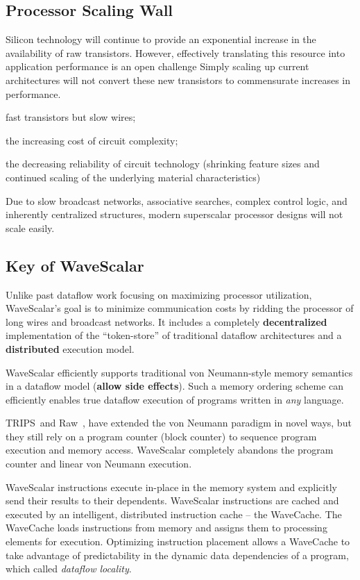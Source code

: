 \documentclass[UTF8,12pt,a4paper]{article}
\begin{document}
\subsection{Processor Scaling Wall}
Silicon technology will continue to provide an exponential increase in the availability of raw transistors.
However, effectively translating this resource into application performance is an open challenge
Simply scaling up current architectures will not convert these new transistors to commensurate increases in performance.

\begin{compactitem}
  \item fast transistors but slow wires;
  \item the increasing cost of circuit complexity;
  \item  the decreasing reliability of circuit technology (shrinking feature sizes
  and continued scaling of the underlying material characteristics)
\end{compactitem}
Due to slow broadcast networks, associative searches,
complex control logic, and inherently centralized structures,
modern superscalar processor designs will not scale easily.

\subsection{Key of WaveScalar}

Unlike past dataflow work focusing on maximizing processor utilization,
WaveScalar’s goal is to minimize communication costs by ridding the processor of long wires and broadcast networks.
It includes a completely \textbf{decentralized} implementation of the ``token-store'' of traditional dataflow architectures
and a \textbf{distributed} execution model.

WaveScalar efficiently supports traditional von Neumann-style memory semantics
in a dataflow model (\textbf{allow side effects}).
Such a memory ordering scheme can efficiently enables
true dataflow execution of programs written in \textit{any} language.

TRIPS~\cite{DBLP:conf/isca/SankaralingamNLKHBKM03}and Raw~\cite{DBLP:conf/asplos/LeeBFSBSA98},
have extended the von Neumann paradigm in novel ways,
but they still rely on a program counter (block counter)
to sequence program execution and memory access.
WaveScalar completely abandons the program counter and linear von Neumann execution.

WaveScalar instructions execute in-place in the memory system
and explicitly send their results to their dependents.
WaveScalar instructions are cached and executed
by an intelligent, distributed instruction cache – the WaveCache.
The WaveCache loads instructions from memory and assigns them to processing elements for execution.
Optimizing instruction placement allows a WaveCache to
take advantage of predictability in the dynamic data dependencies of a program,
which called \textit{dataflow locality}.
\end{document}
